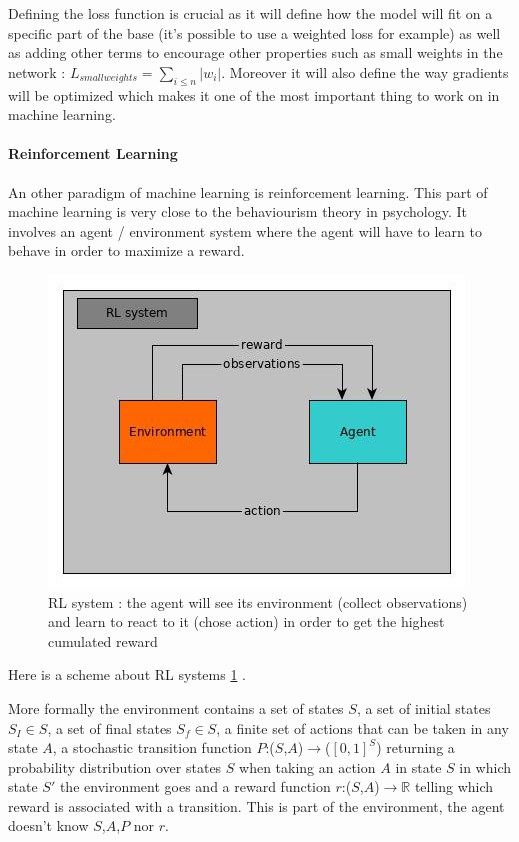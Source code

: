 \documentclass[11pt]{article}
\begin{document}
Defining the loss function is crucial as it will define how the model will fit on a specific part of the base (it's possible to use a weighted loss for example) as well as adding other terms to encourage other properties such as small weights in the network : $L_{small weights} = \sum_{i\le n}|{w_i}|$. Moreover it will also define the way gradients will be optimized which makes it one of the most important thing to work on in machine learning.

\paragraph{Reinforcement Learning}

An other paradigm of machine learning is reinforcement learning. This part of machine learning is very close to the behaviourism theory in psychology. It involves an agent / environment system where the agent will have to learn to behave in order to maximize a reward.
\newpage

\begin{figure}[!h]
\centering
\includegraphics[scale=0.40]{rl.jpg}
\caption{RL system : the agent will see its environment (collect observations) and learn to react to it (chose action) in order to get the highest cumulated reward}
\label{rl}
\end{figure} 
Here is a scheme about RL systems \ref{rl} .

More formally the environment contains a set of states $S$, a set of initial states $S_I\in S$, a set of final states $S_f \in S$, a finite set of actions that can be taken in any state $A$, a stochastic transition function $P$:($S$,$A$)$\rightarrow$($[0,1]^S$) returning a probability distribution over states $S$ when taking an action $A$ in state $S$ in which state $S'$ the environment goes and a reward function $r$:($S$,$A$)$\rightarrow\mathbb{R}$ telling which reward is associated with a transition. This is part of the environment, the agent doesn't know $S$,$A$,$P$ nor $r$.
\end{document}
